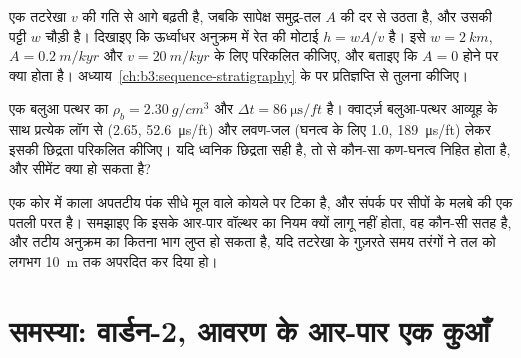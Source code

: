 \begin{exercise}[$\star\star\star$]\label{exo:b3:facies-models:10}
एक तटरेखा $v$ की गति से आगे बढ़ती है, जबकि सापेक्ष समुद्र-तल
$A$ की दर से उठता है, और उसकी  पट्टी $w$ चौड़ी है। दिखाइए कि
ऊर्ध्वाधर अनुक्रम में  रेत की मोटाई $h = wA/v$ है। इसे $w = \qty{2}{km}$,
$A = \qty{0.2}{m/kyr}$ और $v = \qty{20}{m/kyr}$ के लिए परिकलित कीजिए, और बताइए कि
$A = 0$ होने पर क्या होता है। अध्याय~\ref{ch:b3:sequence-stratigraphy} के
 पर प्रतिज्ञप्ति से तुलना कीजिए।
\end{exercise}

\begin{exercise}[$\star\star\star$]\label{exo:b3:facies-models:11}
एक बलुआ पत्थर का $\rho_b = \qty{2.30}{g/cm^3}$ और $\Delta t =
\qty{86}{\micro\second/ft}$ है। क्वार्ट्ज़ बलुआ-पत्थर आव्यूह के साथ प्रत्येक लॉग से
(2.65, \qty{52.6}{\micro\second/ft}) और लवण-जल (घनत्व के लिए 1.0,
\qty{189}{\micro\second/ft}) लेकर इसकी छिद्रता परिकलित कीजिए। यदि ध्वनिक छिद्रता सही है, तो
 से कौन-सा कण-घनत्व निहित होता है, और सीमेंट क्या हो सकता है?
\end{exercise}

\begin{exercise}[$\star\star\star$]\label{exo:b3:facies-models:12}
एक कोर में काला अपतटीय पंक सीधे मूल वाले कोयले पर टिका है, और संपर्क पर
सीपों के मलबे की एक पतली परत है। समझाइए कि इसके आर-पार वॉल्थर का नियम क्यों
लागू नहीं होता, वह कौन-सी सतह है, और तटीय अनुक्रम का कितना भाग
लुप्त हो सकता है, यदि तटरेखा के गुज़रते समय तरंगों ने तल को  लगभग \qty{10}{m} तक अपरदित कर दिया हो।
\end{exercise}

\section{समस्या: वार्डन-2, आवरण के आर-पार एक कुआँ}

